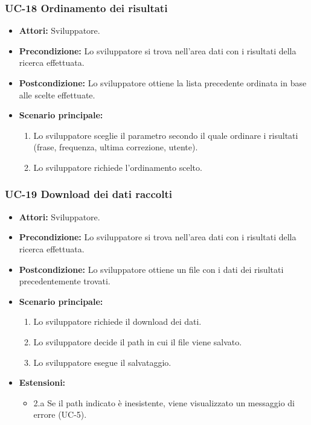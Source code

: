 	\subsubsection{UC-18 Ordinamento dei risultati}
		\begin{itemize}
			\item \textbf{Attori:} Sviluppatore.
			\item \textbf{Precondizione:} Lo sviluppatore si trova nell'area dati con i risultati della ricerca effettuata.
			\item \textbf{Postcondizione:} Lo sviluppatore ottiene la lista precedente ordinata in base alle scelte effettuate.
			\item \textbf{Scenario principale:}
				\begin{enumerate}
					\item Lo sviluppatore sceglie il parametro secondo il quale ordinare i risultati (frase, frequenza, ultima correzione, utente).
					\item Lo sviluppatore richiede l'ordinamento scelto.
				\end{enumerate}
		\end{itemize} 
	
	\subsubsection{UC-19 Download dei dati raccolti}
		\begin{itemize}
			\item \textbf{Attori:} Sviluppatore.
			\item \textbf{Precondizione:} Lo sviluppatore si trova nell'area dati con i risultati della ricerca effettuata.
			\item \textbf{Postcondizione:} Lo sviluppatore ottiene un file con i dati dei risultati precedentemente trovati.
			\item \textbf{Scenario principale:}
				\begin{enumerate}
					\item Lo sviluppatore richiede il download dei dati.
					\item Lo sviluppatore decide il path in cui il file viene salvato.
					\item Lo sviluppatore esegue il salvataggio.
				\end{enumerate}
			\item \textbf{Estensioni:}
				\begin{itemize}
					\item 2.a Se il path indicato è inesistente, viene visualizzato un messaggio di errore (UC-5).
				\end{itemize}
		\end{itemize} 


